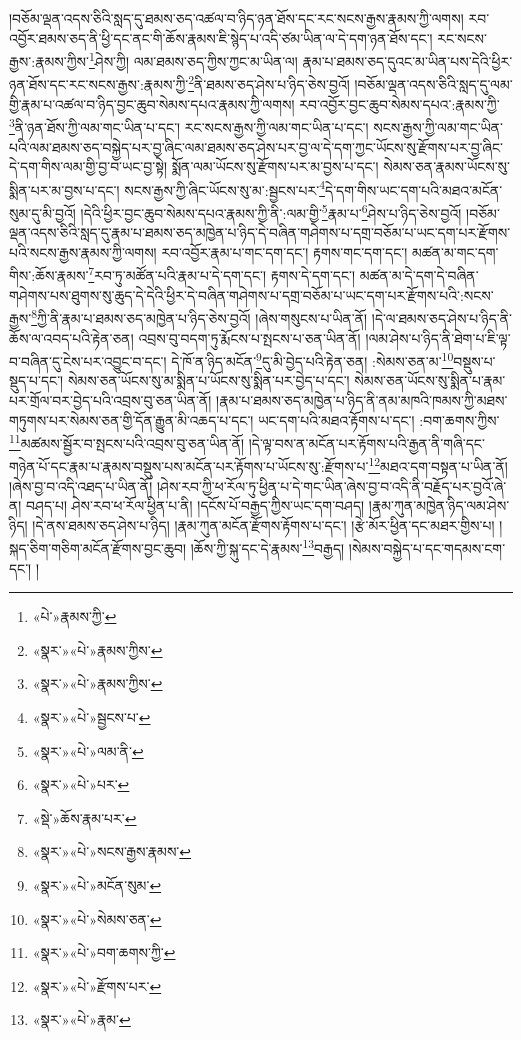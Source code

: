 །བཅོམ་ལྡན་འདས་ཅིའི་སླད་དུ་ཐམས་ཅད་འཚལ་བ་ཉིད་ཉན་ཐོས་དང་རང་སངས་རྒྱས་རྣམས་ཀྱི་ལགས། རབ་འབྱོར་ཐམས་ཅད་ནི་ཕྱི་དང་ནང་གི་ཆོས་རྣམས་ཇི་སྙེད་པ་འདི་ཙམ་ཡིན་ལ་དེ་དག་ཉན་ཐོས་དང་། རང་སངས་རྒྱས་:རྣམས་ཀྱིས་\footnote{«པེ་»རྣམས་ཀྱི་}ཤེས་ཀྱི། ལམ་ཐམས་ཅད་ཀྱིས་ཀྱང་མ་ཡིན་ལ། རྣམ་པ་ཐམས་ཅད་དུའང་མ་ཡིན་པས་དེའི་ཕྱིར་ཉན་ཐོས་དང་རང་སངས་རྒྱས་:རྣམས་ཀྱི་\footnote{«སྣར་»«པེ་»རྣམས་ཀྱིས་}ནི་ཐམས་ཅད་ཤེས་པ་ཉིད་ཅེས་བྱའོ། །བཅོམ་ལྡན་འདས་ཅིའི་སླད་དུ་ལམ་གྱི་རྣམ་པ་འཚལ་བ་ཉིད་བྱང་ཆུབ་སེམས་དཔའ་རྣམས་ཀྱི་ལགས། རབ་འབྱོར་བྱང་ཆུབ་སེམས་དཔའ་:རྣམས་ཀྱི་\footnote{«སྣར་»«པེ་»རྣམས་ཀྱིས་}ནི་ཉན་ཐོས་ཀྱི་ལམ་གང་ཡིན་པ་དང་། རང་སངས་རྒྱས་ཀྱི་ལམ་གང་ཡིན་པ་དང་། སངས་རྒྱས་ཀྱི་ལམ་གང་ཡིན་པའི་ལམ་ཐམས་ཅད་བསྐྱེད་པར་བྱ་ཞིང་ལམ་ཐམས་ཅད་ཤེས་པར་བྱ་ལ་དེ་དག་ཀྱང་ཡོངས་སུ་རྫོགས་པར་བྱ་ཞིང་དེ་དག་གིས་ལམ་གྱི་བྱ་བ་ཡང་བྱ་སྟེ། སྨོན་ལམ་ཡོངས་སུ་རྫོགས་པར་མ་བྱས་པ་དང་། སེམས་ཅན་རྣམས་ཡོངས་སུ་སྨིན་པར་མ་བྱས་པ་དང་། སངས་རྒྱས་ཀྱི་ཞིང་ཡོངས་སུ་མ་:སྦྱངས་པར་\footnote{«སྣར་»«པེ་»སྦྱངས་པ་}དེ་དག་གིས་ཡང་དག་པའི་མཐའ་མངོན་སུམ་དུ་མི་བྱའོ། །དེའི་ཕྱིར་བྱང་ཆུབ་སེམས་དཔའ་རྣམས་ཀྱི་ནི་:ལམ་གྱི་\footnote{«སྣར་»«པེ་»ལམ་ནི་}རྣམ་པ་\footnote{«སྣར་»«པེ་»པར་}ཤེས་པ་ཉིད་ཅེས་བྱའོ། །བཅོམ་ལྡན་འདས་ཅིའི་སླད་དུ་རྣམ་པ་ཐམས་ཅད་མཁྱེན་པ་ཉིད་དེ་བཞིན་གཤེགས་པ་དགྲ་བཅོམ་པ་ཡང་དག་པར་རྫོགས་པའི་སངས་རྒྱས་རྣམས་ཀྱི་ལགས། རབ་འབྱོར་རྣམ་པ་གང་དག་དང་། རྟགས་གང་དག་དང་། མཚན་མ་གང་དག་གིས་:ཆོས་རྣམས་\footnote{«སྡེ་»ཆོས་རྣམ་པར་}རབ་ཏུ་མཚོན་པའི་རྣམ་པ་དེ་དག་དང་། རྟགས་དེ་དག་དང་། མཚན་མ་དེ་དག་དེ་བཞིན་གཤེགས་པས་ཐུགས་སུ་ཆུད་དེ་དེའི་ཕྱིར་དེ་བཞིན་གཤེགས་པ་དགྲ་བཅོམ་པ་ཡང་དག་པར་རྫོགས་པའི་:སངས་རྒྱས་\footnote{«སྣར་»«པེ་»སངས་རྒྱས་རྣམས་}ཀྱི་ནི་རྣམ་པ་ཐམས་ཅད་མཁྱེན་པ་ཉིད་ཅེས་བྱའོ། །ཞེས་གསུངས་པ་ཡིན་ནོ། །དེ་ལ་ཐམས་ཅད་ཤེས་པ་ཉིད་ནི་ཆོས་ལ་འབད་པའི་རྟེན་ཅན། འབྲས་བུ་བདག་ཏུ་རྨོངས་པ་སྤངས་པ་ཅན་ཡིན་ནོ། །ལམ་ཤེས་པ་ཉིད་ནི་ཐེག་པ་ཇི་ལྟ་བ་བཞིན་དུ་ངེས་པར་འབྱུང་བ་དང་། དེ་ཁོ་ན་ཉིད་མངོན་\footnote{«སྣར་»«པེ་»མངོན་སུམ་}དུ་མི་བྱེད་པའི་རྟེན་ཅན། :སེམས་ཅན་མ་\footnote{«སྣར་»«པེ་»སེམས་ཅན་}བསྡུས་པ་སྡུད་པ་དང་། སེམས་ཅན་ཡོངས་སུ་མ་སྨིན་པ་ཡོངས་སུ་སྨིན་པར་བྱེད་པ་དང་། སེམས་ཅན་ཡོངས་སུ་སྨིན་པ་རྣམ་པར་གྲོལ་བར་བྱེད་པའི་འབྲས་བུ་ཅན་ཡིན་ནོ། །རྣམ་པ་ཐམས་ཅད་མཁྱེན་པ་ཉིད་ནི་ནམ་མཁའི་ཁམས་ཀྱི་མཐས་གཏུགས་པར་སེམས་ཅན་གྱི་དོན་རྒྱུན་མི་འཆད་པ་དང་། ཡང་དག་པའི་མཐའ་རྟོགས་པ་དང་། :བག་ཆགས་ཀྱིས་\footnote{«སྣར་»«པེ་»བག་ཆགས་ཀྱི་}མཚམས་སྦྱོར་བ་སྤངས་པའི་འབྲས་བུ་ཅན་ཡིན་ནོ། །དེ་ལྟ་བས་ན་མངོན་པར་རྟོགས་པའི་རྒྱན་ནི་གཞི་དང་གཉེན་པོ་དང་རྣམ་པ་རྣམས་བསྡུས་པས་མངོན་པར་རྟོགས་པ་ཡོངས་སུ་:རྫོགས་པ་\footnote{«སྣར་»«པེ་»རྫོགས་པར་}མཐའ་དག་བསྟན་པ་ཡིན་ནོ། །ཞེས་བྱ་བ་འདི་འཐད་པ་ཡིན་ནོ། །ཤེས་རབ་ཀྱི་ཕ་རོལ་ཏུ་ཕྱིན་པ་དེ་གང་ཡིན་ཞེས་བྱ་བ་འདི་ནི་བརྗོད་པར་བྱའོ་ཞེ་ན། བཤད་པ། ཤེས་རབ་ཕ་རོལ་ཕྱིན་པ་ནི། །དངོས་པོ་བརྒྱད་ཀྱིས་ཡང་དག་བཤད། །རྣམ་ཀུན་མཁྱེན་ཉིད་ལམ་ཤེས་ཉིད། །དེ་ནས་ཐམས་ཅད་ཤེས་པ་ཉིད། །རྣམ་ཀུན་མངོན་རྫོགས་རྟོགས་པ་དང་། །རྩེ་མོར་ཕྱིན་དང་མཐར་གྱིས་པ། །སྐད་ཅིག་གཅིག་མངོན་རྫོགས་བྱང་ཆུབ། །ཆོས་ཀྱི་སྐུ་དང་དེ་རྣམས་\footnote{«སྣར་»«པེ་»རྣམ་}བརྒྱད། །སེམས་བསྐྱེད་པ་དང་གདམས་ངག་དང་། །
